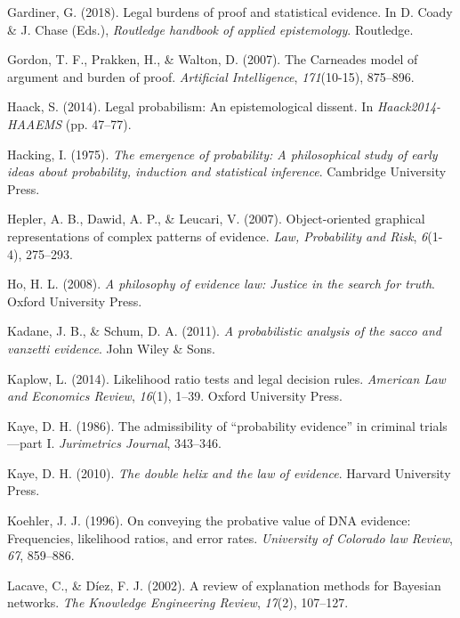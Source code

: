 \documentclass[11pt,dvipsnames,enabledeprecatedfontcommands]{scrartcl}
\begin{document}
\hypertarget{ref-gardiner2018}{}
Gardiner, G. (2018). Legal burdens of proof and statistical evidence. In
D. Coady \& J. Chase (Eds.), \emph{Routledge handbook of applied
epistemology}. Routledge.

\hypertarget{ref-gordon2007}{}
Gordon, T. F., Prakken, H., \& Walton, D. (2007). The Carneades model of
argument and burden of proof. \emph{Artificial Intelligence},
\emph{171}(10-15), 875--896.

\hypertarget{ref-haack2011legal}{}
Haack, S. (2014). Legal probabilism: An epistemological dissent. In
\emph{Haack2014-HAAEMS} (pp. 47--77).

\hypertarget{ref-Hacking1984}{}
Hacking, I. (1975). \emph{The emergence of probability: A philosophical
study of early ideas about probability, induction and statistical
inference}. Cambridge University Press.

\hypertarget{ref-hepler2007ObjectorientedGraphicalRepresentations}{}
Hepler, A. B., Dawid, A. P., \& Leucari, V. (2007). Object-oriented
graphical representations of complex patterns of evidence. \emph{Law,
Probability and Risk}, \emph{6}(1-4), 275--293.

\hypertarget{ref-ho2008philosophy}{}
Ho, H. L. (2008). \emph{A philosophy of evidence law: Justice in the
search for truth}. Oxford University Press.

\hypertarget{ref-kadane2011probabilistic}{}
Kadane, J. B., \& Schum, D. A. (2011). \emph{A probabilistic analysis of
the sacco and vanzetti evidence}. John Wiley \& Sons.

\hypertarget{ref-kaplow2014likelihood}{}
Kaplow, L. (2014). Likelihood ratio tests and legal decision rules.
\emph{American Law and Economics Review}, \emph{16}(1), 1--39. Oxford
University Press.

\hypertarget{ref-kaye1986admissibility}{}
Kaye, D. H. (1986). The admissibility of ``probability evidence'' in
criminal trials---part I. \emph{Jurimetrics Journal}, 343--346.

\hypertarget{ref-Kaye2010The-Double-Heli}{}
Kaye, D. H. (2010). \emph{The double helix and the law of evidence}.
Harvard University Press.

\hypertarget{ref-Koehler1996On-Conveying-th}{}
Koehler, J. J. (1996). On conveying the probative value of DNA evidence:
Frequencies, likelihood ratios, and error rates. \emph{University of
Colorado law Review}, \emph{67}, 859--886.

\hypertarget{ref-lacave2002ReviewExplanationMethodsa}{}
Lacave, C., \& Díez, F. J. (2002). A review of explanation methods for
Bayesian networks. \emph{The Knowledge Engineering Review},
\emph{17}(2), 107--127.
\end{document}
